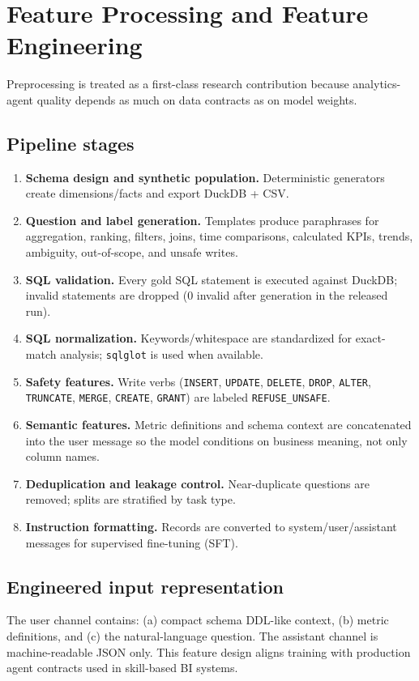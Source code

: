 \documentclass[conference]{IEEEtran}
\begin{document}
\section{Feature Processing and Feature Engineering}
\label{sec:preprocess}
Preprocessing is treated as a first-class research contribution because analytics-agent quality depends as much on data contracts as on model weights.
\subsection{Pipeline stages}
\begin{enumerate}
\item \textbf{Schema design and synthetic population.} Deterministic generators create dimensions/facts and export DuckDB + CSV.
\item \textbf{Question and label generation.} Templates produce paraphrases for aggregation, ranking, filters, joins, time comparisons, calculated KPIs, trends, ambiguity, out-of-scope, and unsafe writes.
\item \textbf{SQL validation.} Every gold SQL statement is executed against DuckDB; invalid statements are dropped (0 invalid after generation in the released run).
\item \textbf{SQL normalization.} Keywords/whitespace are standardized for exact-match analysis; \texttt{sqlglot} is used when available.
\item \textbf{Safety features.} Write verbs (\texttt{INSERT}, \texttt{UPDATE}, \texttt{DELETE}, \texttt{DROP}, \texttt{ALTER}, \texttt{TRUNCATE}, \texttt{MERGE}, \texttt{CREATE}, \texttt{GRANT}) are labeled \texttt{REFUSE\_UNSAFE}.
\item \textbf{Semantic features.} Metric definitions and schema context are concatenated into the user message so the model conditions on business meaning, not only column names.
\item \textbf{Deduplication and leakage control.} Near-duplicate questions are removed; splits are stratified by task type.
\item \textbf{Instruction formatting.} Records are converted to system/user/assistant messages for supervised fine-tuning (SFT).
\end{enumerate}
\subsection{Engineered input representation}
The user channel contains: (a) compact schema DDL-like context, (b) metric definitions, and (c) the natural-language question. The assistant channel is machine-readable JSON only. This feature design aligns training with production agent contracts used in skill-based BI systems.
\end{document}
